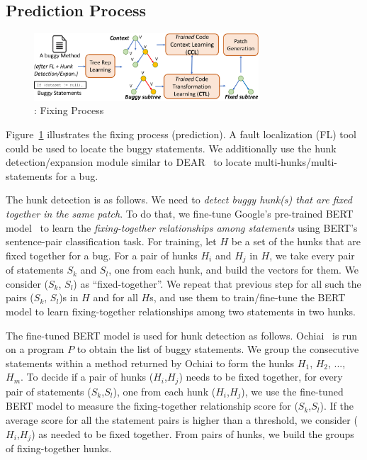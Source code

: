 \subsection{Prediction Process}

\begin{figure}[t]
	\centering
	\includegraphics[width=3.3in]{graphs/overview-predict-5.png}
        \vspace{-6pt}
	\caption{{\tool}: Fixing Process}
	\label{overview-fixing}
\end{figure}

Figure~\ref{overview-fixing} illustrates the fixing process
(prediction). A fault localization (FL) tool could be used to locate
the buggy statements. We additionally use the hunk detection/expansion
module similar to DEAR~\cite{icse22} to locate
multi-hunks/multi-statements for a bug.

The hunk detection is as follows. We need to
{\em detect buggy hunk(s) that are fixed together in the same
  patch}. To do that, we fine-tune Google's pre-trained BERT
model~\cite{devlin2018bert} to learn the {\em fixing-together
  relationships among statements} using BERT's sentence-pair
classification task.
For training, let $H$ be a set of the hunks that are fixed together
for a bug.
For a pair of hunks $H_i$ and $H_j$ in $H$, we take every pair of
statements $S_k$ and $S_l$, one from each hunk, and build the vectors
for them. We consider ($S_k$, $S_l$) as ``fixed-together''. We repeat
that previous step for all such the pairs ($S_k$, $S_l$)s in $H$ and
for all $H$s, and use them to train/fine-tune the BERT model to learn
fixing-together relationships among two statements in two hunks.

The fine-tuned BERT model is used for hunk detection as follows.
Ochiai~\cite{abreu2006evaluation} is run on a program $P$ to obtain
the list of buggy statements. We group the consecutive statements
within a method returned by Ochiai to form the hunks $H_1$, $H_2$,
..., $H_m$. To decide if a pair of hunks ($H_i$,$H_j$) needs to be
fixed together, for every pair of statements ($S_k$,$S_l$), one from
each hunk ($H_i$,$H_j$), we use the fine-tuned BERT model to measure
the fixing-together relationship score for ($S_k$,$S_l$). If the
average score for all the statement pairs is higher than a threshold,
we consider ($H_i$,$H_j$) as needed to be fixed together. From pairs
of hunks, we build the groups of fixing-together hunks.

